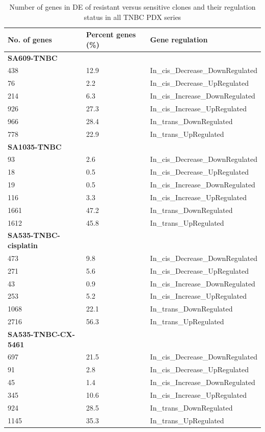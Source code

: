  \begin{table}[htbp]
   \centering
   \caption{Number of genes in DE of resistant versus sensitive clones and their regulation status in all TNBC PDX series}
     \begin{tabular}{|l|l|l|}
     \hline
     \multicolumn{1}{|l|}{\textbf{No. of genes}} & \multicolumn{1}{|l|}{\textbf{Percent genes (\%)}} & \textbf{Gene regulation} \\
     \hline
     \multicolumn{1}{|l|}{\textbf{SA609-TNBC}} &   &  \\
     438 & 12.9 & In\_cis\_Decrease\_DownRegulated \\
     76 & 2.2 & In\_cis\_Decrease\_UpRegulated \\
     214 & 6.3 & In\_cis\_Increase\_DownRegulated \\
     926 & 27.3 & In\_cis\_Increase\_UpRegulated \\
     966 & 28.4 & In\_trans\_DownRegulated \\
     778 & 22.9 & In\_trans\_UpRegulated \\
     \multicolumn{1}{|l|}{\textbf{SA1035-TNBC}} &   &  \\
     93 & 2.6 & In\_cis\_Decrease\_DownRegulated \\
     18 & 0.5 & In\_cis\_Decrease\_UpRegulated \\
     19 & 0.5 & In\_cis\_Increase\_DownRegulated \\
     116 & 3.3 & In\_cis\_Increase\_UpRegulated \\
     1661 & 47.2 & In\_trans\_DownRegulated \\
     1612 & 45.8 & In\_trans\_UpRegulated \\
     \multicolumn{1}{|l|}{\textbf{SA535-TNBC-cisplatin}} &   &  \\
     473 & 9.8 & In\_cis\_Decrease\_DownRegulated \\
     271 & 5.6 & In\_cis\_Decrease\_UpRegulated \\
     43 & 0.9 & In\_cis\_Increase\_DownRegulated \\
     253 & 5.2 & In\_cis\_Increase\_UpRegulated \\
     1068 & 22.1 & In\_trans\_DownRegulated \\
     2716 & 56.3 & In\_trans\_UpRegulated \\
     \multicolumn{1}{|l|}{\textbf{SA535-TNBC-CX-5461}} &   &  \\
     697 & 21.5 & In\_cis\_Decrease\_DownRegulated \\
     91 & 2.8 & In\_cis\_Decrease\_UpRegulated \\
     45 & 1.4 & In\_cis\_Increase\_DownRegulated \\
     345 & 10.6 & In\_cis\_Increase\_UpRegulated \\
     924 & 28.5 & In\_trans\_DownRegulated \\
     1145 & 35.3 & In\_trans\_UpRegulated \\
     \hline
     \end{tabular}%
   \label{tab:NumberofDEgenesandstatus}%
 \end{table}%




